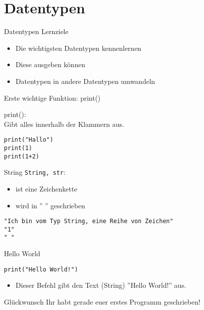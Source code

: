 \section{Datentypen}

\begin{frame}[fragile]{Datentypen}
Lernziele
\begin{itemize}
	\item Die wichtigsten Datentypen kennenlernen
	\item Diese ausgeben können
	\item Datentypen in andere Datentypen umwandeln
\end{itemize}
\end{frame}

\begin{frame}[fragile]{Erste wichtige Funktion: print()}

	print():\\
	Gibt alles innerhalb der Klammern aus.

\begin{lstlisting}
print("Hallo")
print(1)
print(1+2)
\end{lstlisting}
\end{frame}



\begin{frame}[fragile]{String}
\texttt{String, str}: 
     	\begin{itemize}
     		\item ist eine Zeichenkette
     		\item wird in '' '' geschrieben
     	\end{itemize}
       \begin{lstlisting}
"Ich bin vom Typ String, eine Reihe von Zeichen"
"1"
" "
    \end{lstlisting}
\end{frame}

\begin{frame}[fragile]{Hello World}
\begin{lstlisting}
print("Hello World!")
\end{lstlisting}
\begin{itemize}
	\item Dieser Befehl gibt den Text (String) ''Hello World!'' aus.
\end{itemize}
\pause{}
\begin{exampleblock}{Glückwunsch}
	Ihr habt gerade euer erstes Programm geschrieben!
\end{exampleblock}
\end{frame}



